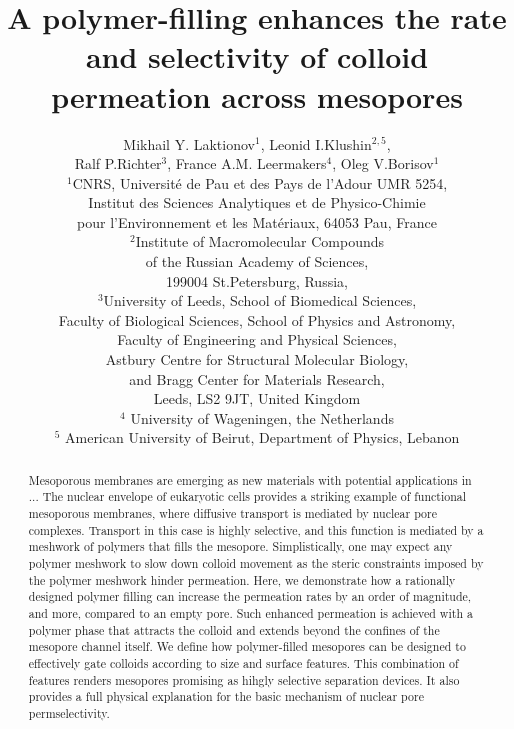\documentclass[12pt, a4paper]{article}
\title{A polymer-filling enhances the rate and selectivity of colloid permeation across mesopores}
\author{Mikhail Y. Laktionov$^1$, Leonid I.Klushin$^{2,5}$,\\Ralf P.Richter$^3$, France A.M. Leermakers$^4$, Oleg V.Borisov$^1$\\
$^{1}$CNRS, Universit\'e de Pau et des Pays de l'Adour UMR 5254,\\
Institut des Sciences Analytiques et de Physico-Chimie\\
pour l'Environnement et les Mat\'eriaux, 64053 Pau, France \\
$^{2}$Institute of Macromolecular Compounds \\
of the Russian Academy of Sciences, \\
199004 St.Petersburg, Russia,\\
$^{3}$University of Leeds, School of Biomedical Sciences, \\
Faculty of Biological Sciences, 
School of Physics and Astronomy, \\
Faculty of Engineering and Physical Sciences,\\  
Astbury Centre for Structural Molecular Biology,\\ 
and Bragg Center for Materials Research,\\ 
Leeds, LS2 9JT, United Kingdom\\
$^{4}$ University of Wageningen, the Netherlands\\
$^{5}$ American University of Beirut, Department of Physics, Lebanon
}
\date{}
\begin{document}
\maketitle

\begin{abstract}


Mesoporous membranes are emerging as new materials with potential applications in ... 
The nuclear envelope of eukaryotic cells provides a striking example of functional mesoporous membranes, where diffusive transport is mediated by nuclear pore complexes.
Transport in this case is highly selective, and this function is mediated by a meshwork of polymers that fills the mesopore. 
Simplistically, one may expect any polymer meshwork to slow down colloid movement as the steric constraints imposed by the polymer meshwork hinder permeation.
Here, we demonstrate how a rationally designed polymer filling can increase the permeation rates by an order of magnitude, and more, compared to an empty pore.
Such enhanced permeation is achieved with a polymer phase that attracts the colloid and extends beyond the confines of the mesopore channel itself.
We define how polymer-filled mesopores can be designed to effectively gate colloids according to size and surface features. 
This combination of features renders mesopores promising as hihgly selective separation devices. It also provides a full physical explanation for the basic mechanism of nuclear pore permselectivity.

\end{abstract}

\end{document}
